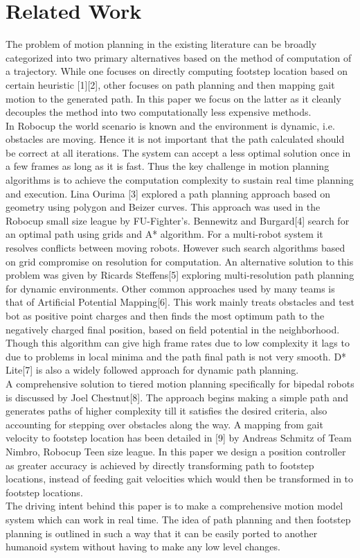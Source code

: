 \documentclass[letterpaper, 10 pt, conference]{ieeeconf}  %
\begin{document}
\section{Related Work}
The problem of motion planning in the existing literature can be broadly categorized into two primary alternatives based on the method of computation of a trajectory. While one focuses on directly computing footstep location based on certain heuristic [1][2], other focuses on path planning and then mapping gait motion to the generated path. In this paper we focus on the latter as it cleanly decouples the method into two computationally less expensive methods.\\
In Robocup the world scenario is known and the environment is dynamic, i.e. obstacles are moving. Hence it is not important that the path calculated should be correct at all iterations. The system can accept a less optimal solution once in a few frames as long as it is fast. Thus the key challenge in motion planning algorithms is to achieve the computation complexity to sustain real time planning and execution.
Lina Ourima [3] explored a path planning approach based on geometry using polygon and Beizer curves. This approach was used in the Robocup small size league by FU-Fighter's. Bennewitz and Burgard[4] search for an optimal path using grids and A* algorithm. For a multi-robot system it resolves conflicts between moving robots. However such search algorithms based on grid compromise on resolution for computation. An alternative solution to this problem was given by Ricards Steffens[5] exploring multi-resolution path planning for dynamic environments. Other common approaches used by many teams is that of Artificial Potential Mapping[6]. This work mainly treats obstacles and test bot as positive point charges and then finds the most optimum path to the negatively charged final position, based on field potential in the neighborhood. Though this algorithm can give high frame rates due to low complexity it lags to due to problems in local minima and the path final path is not very smooth. D* Lite[7] is also a widely followed approach for dynamic path planning.\\
A comprehensive solution to tiered motion planning specifically for bipedal robots is discussed by Joel Chestnut[8]. The approach begins making a simple path and generates paths of higher complexity till it satisfies the desired criteria, also accounting for stepping over obstacles along the way. A mapping from gait velocity to footstep location has been detailed in [9] by Andreas Schmitz of Team Nimbro, Robocup Teen size league. In this paper we design a position controller as greater accuracy is achieved by directly transforming path to footstep locations, instead of feeding gait velocities which would then be transformed in to footstep locations.\\
The driving intent behind this paper is to make a comprehensive motion model system which can work in real time. The idea of path planning and then footstep planning is outlined in such a way that it can be easily ported to another humanoid system without having to make any low level changes.
\end{document}
